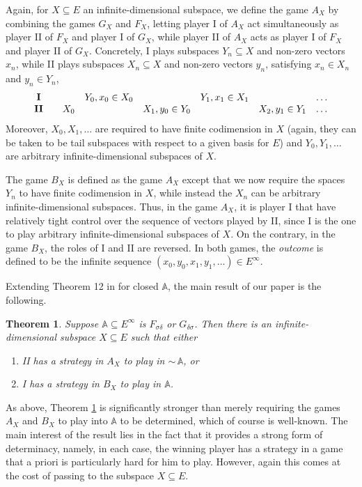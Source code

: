 \documentclass[10pt]{amsart}
\newcommand{\compl}{{\sim\!}}
\newcommand {\A}{\mathbb A}
\newtheorem{thm}{Theorem}[section]
\theoremstyle{definition}
\begin{document}
Again, for $X\subseteq E$ an infinite-dimensional subspace, we define the game $A_X$ by combining the games $G_X$ and $F_X$, letting player I of $A_X$ act simultaneously as player II of $F_X$ and player I of $G_X$, while player II of $A_X$ acts as player I of $F_X$ and player II of $G_X$. Concretely, I plays subspaces $Y_n\subseteq X$ and non-zero vectors $x_n$, while II plays subspaces $X_n\subseteq X$ and non-zero vectors $y_n$, satisfying $x_n\in X_n$ and $y_n\in Y_n$, 
$$
{
\begin{array}{cccccccccccc}
{\bf I} & & &Y_0, x_0\in X_0 &  & Y_1, x_1\in X_1 &  &\ldots \\
{\bf II} & &X_0 &  & X_1, y_0\in Y_0 &  & X_2, y_1\in Y_1   &\ldots
\end{array}
}
$$
Moreover,  $X_0,X_1,\ldots$ are required to have finite codimension in $X$ (again, they can be taken to be tail subspaces with respect to a given basis for $E$) and $Y_0,Y_1,\ldots$ are arbitrary infinite-dimensional subspaces of $X$.

The game $B_X$ is defined as the game $A_X$ except that we now require the spaces $Y_n$ to have finite codimension in $X$, while instead the $X_n$ can be arbitrary infinite-dimensional subspaces. Thus, in the game $A_X$, it is player I that have relatively tight control over the sequence of vectors played by II, since I is the one to play arbitrary infinite-dimensional subspaces of $X$. On the contrary, in the game $B_X$, the roles of I and II are reversed. In both games, the {\em outcome} is defined to be the infinite sequence $(x_0,y_0,x_1,y_1, \ldots)\in E^\infty$. 

Extending Theorem 12 in \cite{exact} for closed $\A$, the main result of our paper is the following. 
\begin{thm}\label{Gdeltasigma}
Suppose $\A\subseteq E^\infty$ is  $F_{\sigma\delta}$ or $G_{\delta\sigma}$. Then there is an infinite-dimensional subspace $X\subseteq E$
such that either
\begin{enumerate}
  \item II has a strategy in $A_X$ to play in $\compl\, \A$, or
  \item I has a strategy in $B_X$ to play in $\A$.
\end{enumerate}
\end{thm}
As above, Theorem \ref{Gdeltasigma} is significantly stronger than merely requiring the games $A_X$ and $B_X$ to play into $\A$ to be determined, which of course is well-known. The main interest of the result lies in the fact that it provides a strong form of determinacy, namely, in each case, the winning player has a strategy in a game that a priori is particularly hard for him to play. However, again this comes at the cost of passing to the subspace $X\subseteq E$. 
\end{document}
